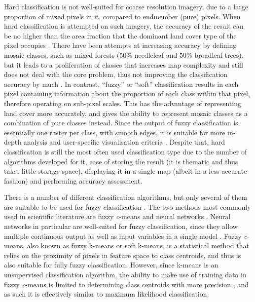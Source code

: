 \documentclass[a4paper,12pt]{scrbook}
\begin{document}
Hard classification is not well-suited for coarse resolution imagery, due to a large proportion of mixed pixels in it, compared to endmember (pure) pixels. When hard classification is attempted on such imagery, the accuracy of the result can be no higher than the area fraction that the dominant land cover type of the pixel occupies \citep{latifovic2004accuracy}. There have been attempts at increasing accuracy by defining mosaic classes, such as mixed forests (50\% needleleaf and 50\% broadleaf trees), but it leads to a proliferation of classes that increases map complexity and still does not deal with the core problem, thus not improving the classification accuracy by much \citep{tsendbazar2016comparative}. In contrast, ``fuzzy'' or ``soft'' classification results in each pixel containing information about the proportion of each class within that pixel, therefore operating on sub-pixel scales. This has the advantage of representing land cover more accurately, and gives the ability to represent mosaic classes as a combination of pure classes instead. Since the output of fuzzy classification is essentially one raster per class, with smooth edges, it is suitable for more in-depth analysis and user-specific visualisation criteria \citep{tsendbazar2016integrating}. Despite that, hard classification is still the most often used classification type due to the number of algorithms developed for it, ease of storing the result (it is thematic and thus takes little storage space), displaying it in a single map (albeit in a less accurate fashion) and performing accuracy assessment.

There is a number of different classification algorithms, but only several of them are suitable to be used for fuzzy classification \citep{nath2014methods}. The two methods most commonly used in scientific literature are fuzzy \textit{c}-means and neural networks \citep{zhang2001fullyfuzzy}. Neural networks in particular are well-suited for fuzzy classification, since they allow multiple continuous output as well as input variables in a single model \citep{foody1997fuzzynnet}. Fuzzy \textit{c}-means, also known as fuzzy k-means or soft k-means, is a statistical method that relies on the proximity of pixels in feature space to class centroids, and thus is also suitable for fully fuzzy classification. However, since k-means is an unsupervised classification algorithm, the ability to make use of training data in fuzzy \textit{c}-means is limited to determining class centroids with more precision \citep{hengl2004fuzzycmeans}, and as such it is effectively similar to maximum likelihood classification.
\end{document}
